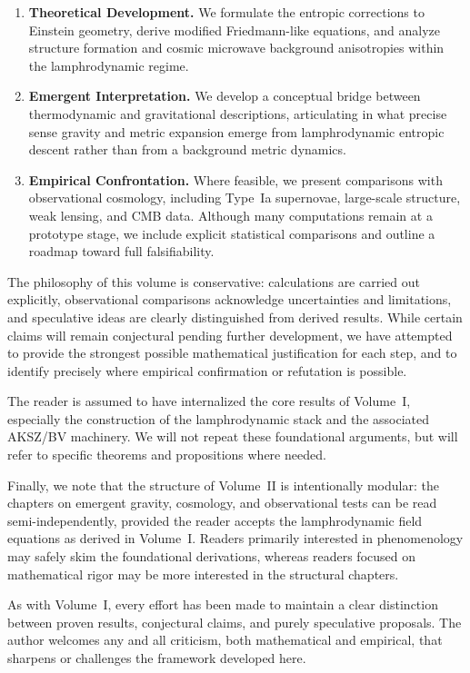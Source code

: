 \documentclass[11pt]{book}
\begin{document}
\begin{enumerate}
\item \textbf{Theoretical Development.} We formulate the entropic corrections to
Einstein geometry, derive modified Friedmann-like equations, and analyze
structure formation and cosmic microwave background anisotropies within the
lamphrodynamic regime.

\item \textbf{Emergent Interpretation.} We develop a conceptual bridge between
thermodynamic and gravitational descriptions, articulating in what precise sense
gravity and metric expansion emerge from lamphrodynamic entropic descent rather
than from a background metric dynamics.

\item \textbf{Empirical Confrontation.} Where feasible, we present comparisons
with observational cosmology, including Type~Ia supernovae, large-scale
structure, weak lensing, and CMB data. Although many computations remain at a
prototype stage, we include explicit statistical comparisons and outline a
roadmap toward full falsifiability.
\end{enumerate}

The philosophy of this volume is conservative: calculations are carried out
explicitly, observational comparisons acknowledge uncertainties and limitations,
and speculative ideas are clearly distinguished from derived results. While
certain claims will remain conjectural pending further development, we have
attempted to provide the strongest possible mathematical justification for each
step, and to identify precisely where empirical confirmation or refutation is
possible.

The reader is assumed to have internalized the core results of Volume~I,
especially the construction of the lamphrodynamic stack and the associated
AKSZ/BV machinery. We will not repeat these foundational arguments, but will
refer to specific theorems and propositions where needed.

Finally, we note that the structure of Volume~II is intentionally modular:
the chapters on emergent gravity, cosmology, and observational tests can be
read semi-independently, provided the reader accepts the lamphrodynamic field
equations as derived in Volume~I. Readers primarily interested in phenomenology
may safely skim the foundational derivations, whereas readers focused on
mathematical rigor may be more interested in the structural chapters.

As with Volume~I, every effort has been made to maintain a clear distinction
between proven results, conjectural claims, and purely speculative proposals.
The author welcomes any and all criticism, both mathematical and empirical,
that sharpens or challenges the framework developed here.
\end{document}
